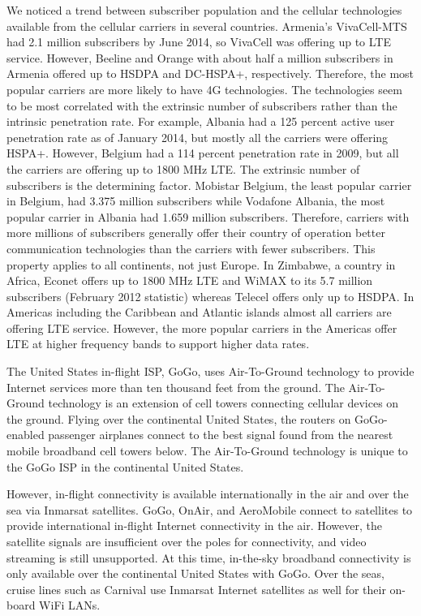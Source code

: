 \documentclass{sigcomm-alternate}
\begin{document}
We noticed a trend between subscriber population and the cellular technologies available from the cellular carriers in several countries. Armenia’s VivaCell-MTS had 2.1 million subscribers by June 2014, so VivaCell was offering up to LTE service. However, Beeline and Orange with about half a million subscribers in Armenia offered up to HSDPA and DC-HSPA+, respectively. Therefore, the most popular carriers are more likely to have 4G technologies. The technologies seem to be most correlated with the extrinsic number of subscribers rather than the intrinsic penetration rate. For example, Albania had a 125 percent active user penetration rate as of January 2014, but mostly all the carriers were offering HSPA+. However, Belgium had a 114 percent penetration rate in 2009, but all the carriers are offering up to 1800 MHz LTE. The extrinsic number of subscribers is the determining factor. Mobistar Belgium, the least popular carrier in Belgium, had 3.375 million subscribers while Vodafone Albania, the most popular carrier in Albania had 1.659 million subscribers. Therefore, carriers with more millions of subscribers generally offer their country of operation better communication technologies than the carriers with fewer subscribers. This property applies to all continents, not just Europe. In Zimbabwe, a country in Africa, Econet offers up to 1800 MHz LTE and WiMAX to its 5.7 million subscribers (February 2012 statistic) whereas Telecel offers only up to HSDPA. In Americas including the Caribbean and Atlantic islands almost all carriers are offering LTE service. However, the more popular carriers in the Americas offer LTE at higher frequency bands to support higher data rates. 
        
The United States in-flight ISP, GoGo, uses Air-To-Ground technology to provide Internet services more than ten thousand feet from the ground. The Air-To-Ground technology is an extension of cell towers connecting cellular devices on the ground. Flying over the continental United States, the routers on GoGo-enabled passenger airplanes connect to the best signal found from the nearest mobile broadband cell towers below. The Air-To-Ground technology is unique to the GoGo ISP in the continental United States. 

However, in-flight connectivity is available internationally in the air and over the sea via Inmarsat satellites. GoGo, OnAir, and AeroMobile connect to satellites to provide international in-flight Internet connectivity in the air. However, the satellite signals are insufficient over the poles for connectivity, and video streaming is still unsupported. At this time, in-the-sky broadband connectivity is only available over the continental United States with GoGo. Over the seas, cruise lines such as Carnival use Inmarsat Internet satellites as well for their on-board WiFi LANs.
\end{document}
